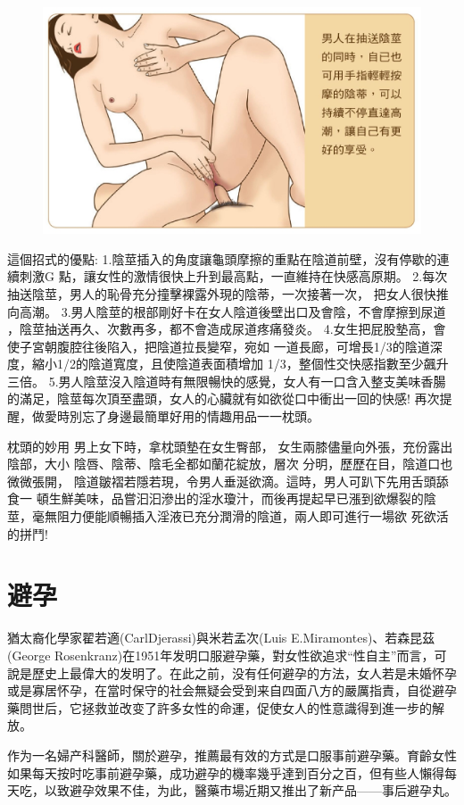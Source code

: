\documentclass[12pt,UTF8]{ctexbook}
\begin{document}
\begin{figure}[htbp]
	\centering
	\includegraphics[width=0.7\linewidth]{31}
	\caption{}
	\label{fig:1}
\end{figure}

這個招式的優點:
1.陰莖插入的角度讓龜頭摩擦的重點在陰道前壁，沒有停歇的連續刺激G
點，讓女性的激情很快上升到最高點，一直維持在快感高原期。
2.每次抽送陰莖，男人的恥骨充分撞擊裸露外現的陰蒂，一次接著一次，
把女人很快推向高潮。
3.男人陰莖的根部剛好卡在女人陰道後壁出口及會陰，不會摩擦到尿道
，陰莖抽送再久、次數再多，都不會造成尿道疼痛發炎。
4.女生把屁股墊高，會使子宮朝腹腔往後陷入，把陰道拉長變窄，宛如
一道長廊，可增長1/3的陰道深度，縮小1/2的陰道寬度，且使陰道表面積增加
1/3，整個性交快感指數至少飆升三倍。
5.男人陰莖沒入陰道時有無限暢快的感覺，女人有一口含入整支美味香腸
的滿足，陰莖每次頂至盡頭，女人的心臟就有如欲從口中衝出一回的快感!
再次提醒，做愛時別忘了身邊最簡單好用的情趣用品一一枕頭。

枕頭的妙用
男上女下時，拿枕頭墊在女生臀部，
女生兩膝儘量向外張，充份露出陰部，大小
陰唇、陰蒂、陰毛全都如蘭花綻放，層次
分明，歷歷在目，陰道口也微微張開，
陰道皺褶若隱若現，令男人垂涎欲滴。這時，男人可趴下先用舌頭舔食一
頓生鮮美味，品嘗汩汩滲出的淫水瓊汁，而後再提起早已漲到欲爆裂的陰
莖，毫無阻力便能順暢插入淫液已充分潤滑的陰道，兩人即可進行一場欲
死欲活的拼鬥!



\chapter{避孕}

猶太裔化學家翟若適(CarlDjerassi)與米若孟次(Luis E.Miramontes)、若森昆茲(George Rosenkranz)在1951年发明口服避孕藥，對女性欲追求“性自主”而言，可說是歷史上最偉大的发明了。在此之前，没有任何避孕的方法，女人若是未婚怀孕或是寡居怀孕，在當时保守的社会無疑会受到来自四面八方的嚴厲指責，自從避孕藥問世后，它拯救並改变了許多女性的命運，促使女人的性意識得到進一步的解放。

作为一名婦产科醫師，關於避孕，推薦最有效的方式是口服事前避孕藥。育齡女性如果每天按时吃事前避孕藥，成功避孕的機率幾乎達到百分之百，但有些人懶得每天吃，以致避孕效果不佳，为此，醫藥市場近期又推出了新产品——事后避孕丸。
\end{document}
